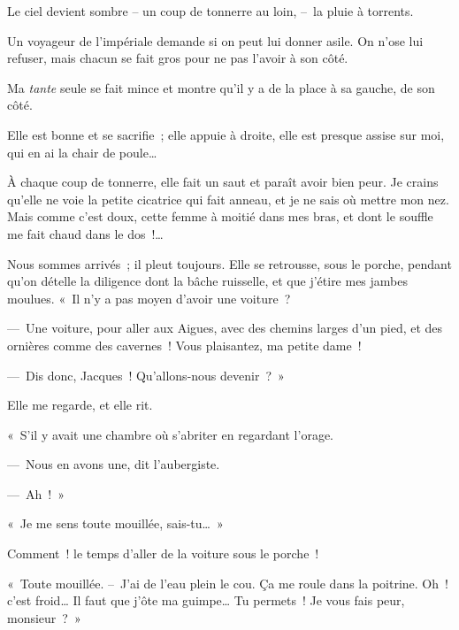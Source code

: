 \documentclass[french,twoside]{book} %
\newcommand{\astertri}{\medskip\par\centerline{\color{rubric}\large\selectfont{\syms ✻\,✻\,✻}}\medskip\par}%
\def\mednobreak{\ifdim\lastskip<\medskipamount
  \removelastskip\nopagebreak\medskip\fi}
\newcommand{\labelblock}[1]{\medbreak{\noindent\color{rubric}\bfseries #1}\par\mednobreak}
\begin{document}
Le ciel devient sombre – un coup de tonnerre au loin, – la pluie à torrents.\par
Un voyageur de l’impériale demande si on peut lui donner asile. On n’ose lui refuser, mais chacun se fait gros pour ne pas l’avoir à son côté.\par
Ma \emph{tante} seule se fait mince et montre qu’il y a de la place à sa gauche, de son côté.\par
Elle est bonne et se sacrifie ; elle appuie à droite, elle est presque assise sur moi, qui en ai la chair de poule…\par
À chaque coup de tonnerre, elle fait un saut et paraît avoir bien peur. Je crains qu’elle ne voie la petite cicatrice qui fait anneau, et je ne sais où mettre mon nez. Mais comme c’est doux, cette femme à moitié dans mes bras, et dont le souffle me fait chaud dans le dos !…\par
\bigbreak
\noindent Nous sommes arrivés ; il pleut toujours. Elle se retrousse, sous le porche, pendant qu’on dételle la diligence dont la bâche ruisselle, et que j’étire mes jambes moulues. « Il n’y a pas moyen d’avoir une voiture ?\par
— Une voiture, pour aller aux Aigues, avec des chemins larges d’un pied, et des ornières comme des cavernes ! Vous plaisantez, ma petite dame !\par
— Dis donc, Jacques ! Qu’allons-nous devenir ? »\par
Elle me regarde, et elle rit.\par
« S’il y avait une chambre où s’abriter en regardant l’orage.\par
— Nous en avons une, dit l’aubergiste.\par
— Ah ! »\par

\labelblock{DANS LA CHAMBRE}

\noindent « Je me sens toute mouillée, sais-tu… »\par
Comment ! le temps d’aller de la voiture sous le porche !\par
« Toute mouillée. – J’ai de l’eau plein le cou. Ça me roule dans la poitrine. Oh ! c’est froid… Il faut que j’ôte ma guimpe… Tu permets ! Je vous fais peur, monsieur ? »\par

\astertri
\end{document}
